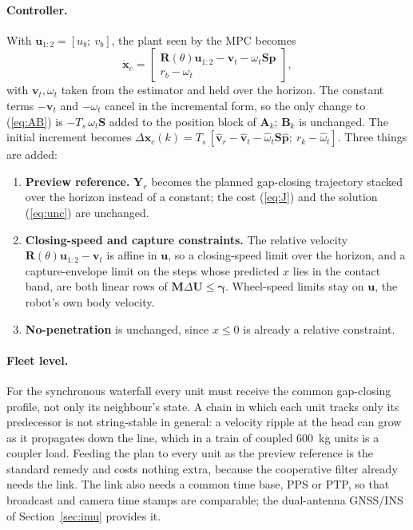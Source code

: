\documentclass[11pt,a4paper]{article}
\newcommand{\vect}[1]{\bm{#1}}
\newcommand{\mat}[1]{\bm{#1}}
\newcommand{\Rot}{\mat{R}}
\newcommand{\dU}{\Delta\vect{U}}
\newcommand{\Ts}{T_s}
\begin{document}
\paragraph{Controller.} With $\vect u_{1:2} = [u_b;\ v_b]$, the plant seen by the MPC becomes
\begin{equation}
\dot{\vect x}_c = \begin{bmatrix}\Rot(\theta)\vect u_{1:2} - \vect v_t - \omega_t\mat S\vect p\\ r_b - \omega_t\end{bmatrix},
\end{equation}
with $\vect v_t,\omega_t$ taken from the estimator and held over the horizon. The constant terms $-\vect v_t$ and $-\omega_t$ cancel in the incremental form, so the only change to (\ref{eq:AB}) is $-\Ts\,\omega_t\mat S$ added to the position block of $\mat A_k$; $\mat B_k$ is unchanged. The initial increment becomes $\Delta\vect x_c(k) = \Ts\,[\hat{\vect v}_r - \hat{\vect v}_t - \hat\omega_t\mat S\hat{\vect p};\ r_k - \hat\omega_t]$. Three things are added:
\begin{enumerate}[nosep]
  \item \textbf{Preview reference.} $\vect Y_r$ becomes the planned gap-closing trajectory stacked over the horizon instead of a constant; the cost (\ref{eq:J}) and the solution (\ref{eq:unc}) are unchanged.
  \item \textbf{Closing-speed and capture constraints.} The relative velocity $\Rot(\theta)\vect u_{1:2} - \vect v_t$ is affine in $\vect u$, so a closing-speed limit over the horizon, and a capture-envelope limit on the steps whose predicted $x$ lies in the contact band, are both linear rows of $\mat M\dU\le\vect\gamma$. Wheel-speed limits stay on $\vect u$, the robot's own body velocity.
  \item \textbf{No-penetration} is unchanged, since $x\le 0$ is already a relative constraint.
\end{enumerate}

\paragraph{Fleet level.} For the synchronous waterfall every unit must receive the common gap-closing profile, not only its neighbour's state. A chain in which each unit tracks only its predecessor is not string-stable in general: a velocity ripple at the head can grow as it propagates down the line, which in a train of coupled 600~kg units is a coupler load. Feeding the plan to every unit as the preview reference is the standard remedy and costs nothing extra, because the cooperative filter already needs the link. The link also needs a common time base, PPS or PTP, so that broadcast and camera time stamps are comparable; the dual-antenna GNSS/INS of Section~\ref{sec:imu} provides it.
\end{document}
